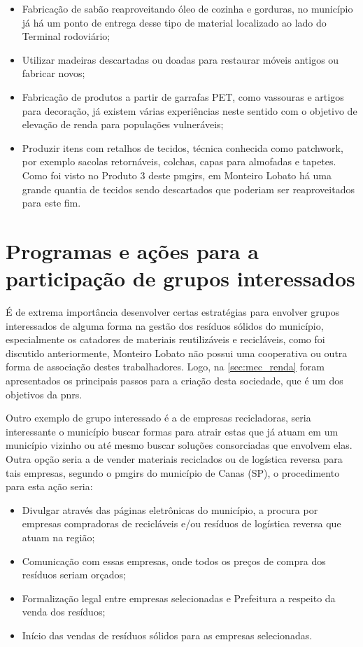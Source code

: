 \begin{itemize}
	\item Fabricação de sabão reaproveitando óleo de cozinha e gorduras, no município já há um ponto de entrega desse tipo de material localizado ao lado do Terminal rodoviário;
	\item Utilizar madeiras descartadas ou doadas para restaurar móveis antigos ou fabricar novos;
	\item Fabricação de produtos a partir de garrafas PET, como vassouras e artigos para decoração, já existem várias experiências neste sentido com o objetivo de elevação de renda para populações vulneráveis;
	\item Produzir itens com retalhos de tecidos, técnica conhecida como patchwork, por exemplo sacolas retornáveis, colchas, capas para almofadas e tapetes. Como foi visto no Produto 3 deste \gls{pmgirs}, em Monteiro Lobato há uma grande quantia de tecidos sendo descartados que poderiam ser reaproveitados para este fim.
\end{itemize}    

\FloatBarrier
\newpage
\section{Programas e ações para a participação de grupos interessados}
\label{sec:grup_int}

É de extrema importância desenvolver certas estratégias para envolver grupos interessados de alguma forma na gestão dos resíduos sólidos do município, especialmente os catadores de materiais reutilizáveis e recicláveis, como foi discutido anteriormente, Monteiro Lobato não possui uma cooperativa ou outra forma de associação destes trabalhadores. Logo, na \autoref{sec:mec_renda} foram apresentados os principais passos para a criação desta sociedade, que é um dos objetivos da \gls{pnrs}.

Outro exemplo de grupo interessado é a de empresas recicladoras, seria interessante o município buscar formas para atrair estas que já atuam em um município vizinho ou até mesmo buscar soluções consorciadas que envolvem elas. Outra opção seria a de vender materiais reciclados ou de logística reversa para tais empresas, segundo o \gls{pmgirs} do município de Canas (SP), o procedimento para esta ação seria: \cite{pmgirs_canas}

\begin{itemize}
	\item Divulgar através das páginas eletrônicas do município, a procura por empresas compradoras de recicláveis e/ou resíduos de logística reversa que atuam na região;
	\item Comunicação com essas empresas, onde todos os preços de compra dos resíduos seriam orçados;
	\item Formalização legal entre empresas selecionadas e Prefeitura a respeito da venda dos resíduos;
	\item Início das vendas de resíduos sólidos para as empresas selecionadas.
\end{itemize} 

